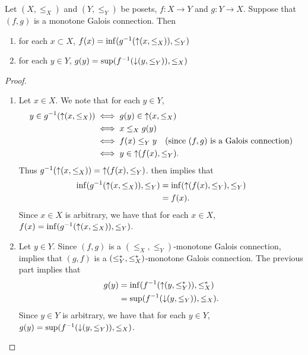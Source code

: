 \documentclass{book}
\begin{document}
	\begin{ex} 
		Let $(X, \leq_X)$ and $(Y, \leq_Y)$ be posets, $f: X \rightarrow Y$ and $g:Y \rightarrow X$. Suppose that $(f,g)$ is a monotone Galois connection. Then
		\begin{enumerate}
			\item for each $x \subset X$, $f(x) = \inf (g^{-1}(\operatorname{\uparrow}(x, \leq_X)), \leq_Y )$
			\item for each $y \in Y$, $g(y) = \sup (f^{-1}(\operatorname{\downarrow}(y, \leq_Y)), \leq_X)$
		\end{enumerate}
	\end{ex}
	
	\begin{proof}\
		\begin{enumerate}
			\item Let $x \in X$. We note that for each $y \in Y$, 
			\begin{align*}
				y \in g^{-1}(\operatorname{\uparrow}(x, \leq_X))
				& \iff g(y) \in \operatorname{\uparrow}(x, \leq_X) \\
				& \iff x \leq_X g(y) \\
				& \iff f(x) \leq_Y y  \quad \text{(since $(f,g)$ is a Galois connection)} \\
				& \iff y \in \operatorname{\uparrow}(f(x), \leq_Y).
			\end{align*}
			Thus $g^{-1}(\operatorname{\uparrow}(x, \leq_X)) = \operatorname{\uparrow}(f(x), \leq_Y)$.  then implies that
			\begin{align*}
				\inf (g^{-1}(\operatorname{\uparrow}(x, \leq_X)), \leq_Y )
				& = \inf ( \operatorname{\uparrow}(f(x), \leq_Y), \leq_Y) \\
				& = f(x).
			\end{align*}
			Since $x \in X$ is arbitrary, we have that for each $x \in X$, $f(x) = \inf (g^{-1}(\operatorname{\uparrow}(x, \leq_X)), \leq_Y )$.
			\item Let $y \in Y$. Since $(f, g)$ is a $(\leq_X, \leq_Y)$-monotone Galois connection, \rex{}  implies that $(g, f)$ is a $(\leq^*_Y, \leq^*_X)$-monotone Galois connection. The previous part  implies that
			\begin{align*}
				g(y) 
				& = \inf (f^{-1}(\operatorname{\uparrow}(y, \leq^*_Y)), \leq^*_X ) \\
				& = \sup (f^{-1}(\operatorname{\downarrow}(y, \leq_Y)), \leq_X ).
			\end{align*}
			Since $y \in Y$ is arbitrary, we have that for each $y \in Y$, $g(y) = \sup (f^{-1}(\operatorname{\downarrow}(y, \leq_Y)), \leq_X)$.
		\end{enumerate}
	\end{proof}
	
\end{document}
